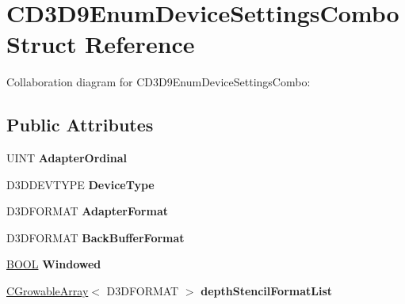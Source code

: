\hypertarget{struct_c_d3_d9_enum_device_settings_combo}{\section{C\+D3\+D9\+Enum\+Device\+Settings\+Combo Struct Reference}
\label{struct_c_d3_d9_enum_device_settings_combo}
}


Collaboration diagram for C\+D3\+D9\+Enum\+Device\+Settings\+Combo\+:
\subsection*{Public Attributes}
\begin{DoxyCompactItemize}
\item 
\hypertarget{struct_c_d3_d9_enum_device_settings_combo_a2e3ac6d65229629ef9943033a2d7b855}{U\+I\+N\+T {\bfseries Adapter\+Ordinal}}\label{struct_c_d3_d9_enum_device_settings_combo_a2e3ac6d65229629ef9943033a2d7b855}

\item 
\hypertarget{struct_c_d3_d9_enum_device_settings_combo_a482f6dc1def52b69b5ad59dc95860727}{D3\+D\+D\+E\+V\+T\+Y\+P\+E {\bfseries Device\+Type}}\label{struct_c_d3_d9_enum_device_settings_combo_a482f6dc1def52b69b5ad59dc95860727}

\item 
\hypertarget{struct_c_d3_d9_enum_device_settings_combo_a5321c66c67aa9b54dd4f1b7d4e5ea0a1}{D3\+D\+F\+O\+R\+M\+A\+T {\bfseries Adapter\+Format}}\label{struct_c_d3_d9_enum_device_settings_combo_a5321c66c67aa9b54dd4f1b7d4e5ea0a1}

\item 
\hypertarget{struct_c_d3_d9_enum_device_settings_combo_aa27d338758f5bdff71add1058eb89eef}{D3\+D\+F\+O\+R\+M\+A\+T {\bfseries Back\+Buffer\+Format}}\label{struct_c_d3_d9_enum_device_settings_combo_aa27d338758f5bdff71add1058eb89eef}

\item 
\hypertarget{struct_c_d3_d9_enum_device_settings_combo_a06a17893640d4da95dffaac4a30825dd}{\hyperlink{_ice_types_8h_a050c65e107f0c828f856a231f4b4e788}{B\+O\+O\+L} {\bfseries Windowed}}\label{struct_c_d3_d9_enum_device_settings_combo_a06a17893640d4da95dffaac4a30825dd}

\item 
\hypertarget{struct_c_d3_d9_enum_device_settings_combo_ac893df0252003b1ff4e3a23fefb58976}{\hyperlink{class_c_growable_array}{C\+Growable\+Array}$<$ D3\+D\+F\+O\+R\+M\+A\+T $>$ {\bfseries depth\+Stencil\+Format\+List}}\label{struct_c_d3_d9_enum_device_settings_combo_ac893df0252003b1ff4e3a23fefb58976}


\end{DoxyCompactItemize}
